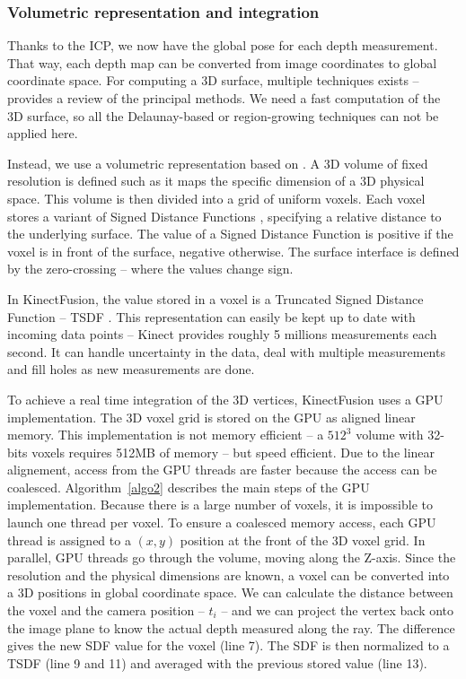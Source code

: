 \documentclass[12pt, twoside]{article}
\begin{document}
\subsubsection{Volumetric representation and integration}
Thanks to the ICP, we now have the global pose for each depth measurement. That way, each depth map can be converted from image coordinates to global coordinate space. For computing a 3D surface, multiple techniques exists -- \cite{ISO} provides a review of the principal methods. We need a fast computation of the 3D surface, so all the Delaunay-based or region-growing techniques can not be applied here.

Instead, we use a volumetric representation based on \cite{VolRep}. A 3D volume of fixed resolution is defined such as it maps the specific dimension of a 3D physical space. This volume is then divided into a grid of uniform voxels. Each voxel stores a variant of Signed Distance Functions \cite{SDF}, specifying a relative distance to the underlying surface. The value of a Signed Distance Function is positive if the voxel is in front of the surface, negative otherwise. The surface interface is defined by the zero-crossing -- where the values change sign.

In KinectFusion, the value stored in a voxel is a Truncated Signed Distance Function -- TSDF \cite{VolRep}. This representation can easily be kept up to date with incoming data points -- Kinect provides roughly 5 millions measurements each second. It can handle uncertainty in the data, deal with multiple measurements and fill holes as new measurements are done.

To achieve a real time integration of the 3D vertices, KinectFusion uses a GPU implementation. The 3D voxel grid is stored on the GPU as aligned linear memory. This implementation is not memory efficient -- a $512^3$ volume with 32-bits voxels requires 512MB of memory -- but speed efficient. Due to the linear alignement, access from the GPU threads are faster because the access can be coalesced. Algorithm~\ref{algo2} describes the main steps of the GPU implementation. Because there is a large number of voxels, it is impossible to launch one thread per voxel. To ensure a coalesced memory access, each GPU thread is assigned to a $(x,y)$ position at the front of the 3D voxel grid. In parallel, GPU threads go through the volume, moving along the Z-axis. Since the resolution and the physical dimensions are known, a voxel can be converted into a 3D positions in global coordinate space. We can calculate the distance between the voxel and the camera position -- $t_i$ -- and we can project the vertex back onto the image plane to know the actual depth measured along the ray. The difference gives the new SDF value for the voxel (line 7). The SDF is then normalized to a TSDF (line 9 and 11) and averaged with the previous stored value (line 13).
\end{document}
